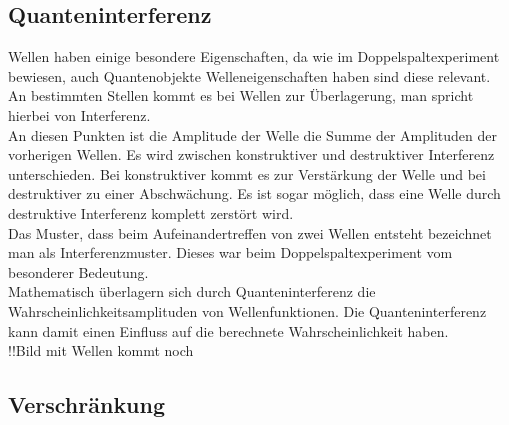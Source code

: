 \subsection{Quanteninterferenz}

Wellen haben einige besondere Eigenschaften, da wie im Doppelspaltexperiment bewiesen, auch Quantenobjekte Welleneigenschaften haben sind diese relevant. An bestimmten Stellen kommt es bei Wellen zur Überlagerung, man spricht hierbei von Interferenz.\\
An diesen Punkten ist die Amplitude der Welle die Summe der Amplituden der vorherigen Wellen. Es wird zwischen konstruktiver und destruktiver Interferenz unterschieden. Bei konstruktiver kommt es zur Verstärkung der Welle und bei destruktiver zu einer Abschwächung. Es ist sogar möglich, dass eine Welle durch destruktive Interferenz komplett zerstört wird.\\
Das Muster, dass beim Aufeinandertreffen von zwei Wellen entsteht bezeichnet man als Interferenzmuster. Dieses war beim Doppelspaltexperiment vom besonderer Bedeutung.\\
Mathematisch überlagern sich durch Quanteninterferenz die Wahrscheinlichkeitsamplituden von Wellenfunktionen. Die Quanteninterferenz kann damit einen Einfluss auf die berechnete Wahrscheinlichkeit haben.
\\

!!Bild mit Wellen kommt noch

\subsection{Verschränkung }
\label{sec: Verschränkung}

